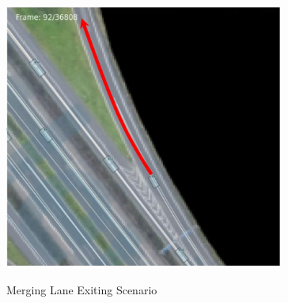 \begin{frame}
\begin{figure}
\begin{minipage}[b]{0.49\linewidth}
        \centering
        \includegraphics[width=0.82\textwidth]{figures/pictures_first_part/street_with_arrow_2.jpeg}

        \centering \footnotesize Merging Lane Exiting Scenario
    \end{minipage}
  \end{figure}
\end{frame}








